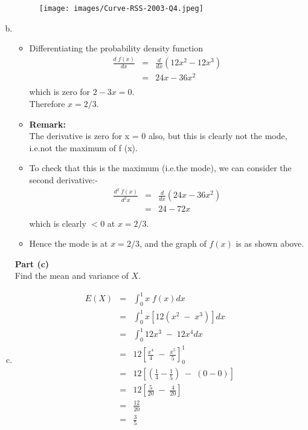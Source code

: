 \documentclass[a4paper,12pt]{article}
\begin{document}
\begin{enumerate}[(a)]
\begin{figure}[h!]
\centering
\texttt{[image: images/Curve-RSS-2003-Q4.jpeg]}
\end{figure}
\item  
\begin{itemize}
\item Differentiating the probability density function
\begin{eqnarray*}
\frac{d\;f(x)}{dx} &=& \frac{d}{dx}\left( 12x^2-12x^3 \right)\\
&=&  24x-36x^2 \\
\end{eqnarray*}
which is zero for $2 - 3x = 0$.\\
Therefore $x = 2/3$.
\smallskip
\item \noindent \textbf{Remark:} \\ The derivative is zero for x = 0 also, but this is clearly not the mode, i.e.not the maximum of f (x).
\newpage
    \item 
To check that this is the maximum (i.e.the mode), we can consider the second derivative:-
\begin{eqnarray*}
\frac{d^2\;f(x)}{d^2x} &=& \frac{d}{dx}\left( 24x-36x^2 \right)\\
&=&  24-72x \\
\end{eqnarray*}
which is clearly $< 0$ at $x = 2/3$.
\item Hence the mode is at $x = 2/3$, and the graph of $f(x)$ is as shown above. 


\end{itemize}
\large

\newpage
\begin{framed}
\large
\noindent \textbf{Part (c)}\\
Find the mean and variance of $X$.

\end{framed}
\large
\item  
\begin{eqnarray*}
E(X) &=& \int^{1}_{0} x \;f(x) dx \\
&=& \int^{1}_{0} x[12(x^2\;-\;x^3)] dx \\
&=& \int^{1}_{0} 12x^3\;-\;12x^4 dx \\
&=& 12 \left[ \frac{x^4}{4} \;-\; \frac{x^5}{5}\right]^1_0\\
&=& 12 \left[ \left( \frac{1}{4}- \frac{1}{5}\right) \;-\; \left( 0 - 0 \right)  \right]\\
&=& 12 \left[  \frac{5}{20} \;-\; \frac{4}{20} \right]\\
&=&  \frac{12}{20} \\
&=&  \frac{3}{5}\\
\end{eqnarray*}


\end{enumerate}
\end{document}
